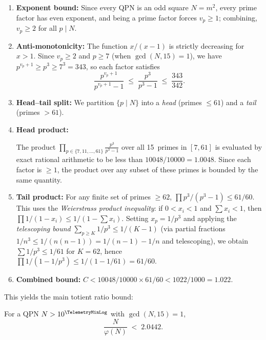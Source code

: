 \begin{enumerate}
  \item \textbf{Exponent bound:}
    Since every QPN is an odd square $N = m^2$, every prime factor has
    even exponent, and being a prime factor forces $v_p \ge 1$;
    combining, $v_p \ge 2$ for all $p \mid N$.

  \item \textbf{Anti-monotonicity:}
    The function $x/(x-1)$ is strictly decreasing for $x > 1$.
    Since $v_p \ge 2$ and $p \ge 7$ (when $\gcd(N,15)=1$), we have
    $p^{v_p+1} \ge p^3 \ge 7^3 = 343$, so each factor satisfies
    \[
      \frac{p^{v_p+1}}{p^{v_p+1}-1}
      \;\le\;
      \frac{p^3}{p^3-1}
      \;\le\;
      \frac{343}{342}.
    \]

  \item \textbf{Head--tail split:}
    We partition $\{p \mid N\}$ into a \emph{head} (primes $\le 61$)
    and a \emph{tail} (primes $> 61$).

  \item \textbf{Head product:}
    \begin{sloppypar}
    The product
    $\prod_{p \in \{7,11,\ldots,61\}} \frac{p^3}{p^3-1}$ over all
    15~primes in $[7,61]$ is evaluated by exact rational arithmetic
    to be less than $10048/10000 = 1.0048$.  Since each factor is
    $\ge 1$, the product over any subset of these primes is bounded
    by the same quantity.
    \end{sloppypar}

  \item \textbf{Tail product:}
    For any finite set of primes $\ge 62$,
    $\prod p^3/(p^3-1) \le 61/60$.  This uses the \emph{Weierstrass
    product inequality}: if $0 < x_i < 1$ and $\sum x_i < 1$, then
    $\prod 1/(1-x_i) \le 1/(1-\sum x_i)$.  Setting $x_p = 1/p^3$
    and applying the \emph{telescoping bound}
    $\sum_{p \ge K} 1/p^3 \le 1/(K-1)$ (via partial fractions
    $1/n^3 \le 1/(n(n-1)) = 1/(n-1) - 1/n$ and telescoping), we
    obtain $\sum 1/p^3 \le 1/61$ for $K = 62$, hence
    $\prod 1/(1-1/p^3) \le 1/(1-1/61) = 61/60$.

  \item \textbf{Combined bound:}
    $C < 10048/10000 \times 61/60 < 1022/1000 = 1.022$.
\end{enumerate}


\medskip
This yields the main totient ratio bound:

\begin{theorem}\label{thm:totient-bound}
  For a QPN $N > 10^{\TelemetryMinLog}$ with $\gcd(N,15)=1$,
  \[
    \frac{N}{\varphi(N)} \;<\; 2.0442.
  \]
\end{theorem}

